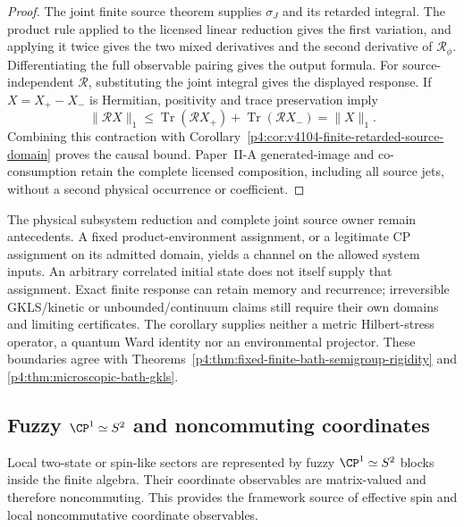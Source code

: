 \documentclass[12pt,a4paper]{article}
\begin{document}
\begin{proof}
The joint finite source theorem supplies $\sigma_J$ and its retarded
integral.  The product rule applied to the licensed linear reduction gives
the first variation, and applying it twice gives the two mixed derivatives
and the second derivative of $\mathcal R_\phi$.  Differentiating the full
observable pairing gives the output formula.  For source-independent
$\mathcal R$, substituting the joint integral gives the displayed response.
If $X=X_+-X_-$ is Hermitian, positivity and trace preservation imply
\[
 \|\mathcal R X\|_1
 \le\operatorname{Tr}(\mathcal R X_+)+\operatorname{Tr}(\mathcal R X_-)
 =\|X\|_1.
\]
Combining this contraction with
Corollary~\ref{p4:cor:v4104-finite-retarded-source-domain} proves the causal
bound.  Paper~II-A generated-image and co-consumption retain the complete
licensed composition, including all source jets, without a second physical
occurrence or coefficient.
\end{proof}

The physical subsystem reduction and complete joint source owner remain
antecedents.  A fixed product-environment assignment, or a legitimate CP
assignment on its admitted domain, yields a channel on the allowed system
inputs.  An arbitrary correlated initial state does not itself supply that
assignment.  Exact finite response can retain memory and recurrence;
irreversible GKLS/kinetic or unbounded/continuum claims still require their
own domains and limiting certificates.  The corollary supplies neither a
metric Hilbert-stress operator, a quantum Ward identity nor an environmental
projector.  These boundaries agree with
Theorems~\ref{p4:thm:fixed-finite-bath-semigroup-rigidity} and
\ref{p4:thm:microscopic-bath-gkls}.








\subsection{Fuzzy \texorpdfstring{$\CP^1\simeq S^2$}{CP1=S2} and noncommuting coordinates}
\label{p4:sec:part2-fuzzycp1}

Local two-state or spin-like sectors are represented by fuzzy $\CP^1\simeq S^2$ blocks inside the finite algebra.
Their coordinate observables are matrix-valued and therefore noncommuting.
This provides the framework source of effective spin and local noncommutative coordinate observables.
\end{document}
